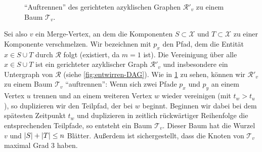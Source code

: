 \begin{beweis}
\begin{figure}
{\label{fig:entwirren-baum}}
		\caption{\enquote{Auftrennen} des gerichteten azyklischen Graphen $\mathcal{R}'_v$ zu einem Baum $\mathcal{T}_v$.}
	\end{figure}
	
	Sei also $v$ ein Merge-Vertex, an dem die Komponenten $S \subset \mathcal{X}$ und $T \subset \mathcal{X}$ zu einer Komponente verschmelzen.
	Wir bezeichnen mit $p_x$ den Pfad, dem die Entität $x \in S \cup T$ durch $\mathcal{R}$ folgt (existiert, da $m=1$ ist).
	Die Vereinigung über alle $x \in S \cup T$ ist ein gerichteter azyklischer Graph $\mathcal{R}'_v$ und insbesondere ein Untergraph von $\mathcal{R}$ (siehe \cref{fig:entwirren-DAG}).
	Wie in \cref{fig:entwirren-baum} zu sehen, können wir $\mathcal{R}'_v$ zu einem Baum $\mathcal{T}_v$ \enquote{auftrennen}:
	Wenn sich zwei Pfade $p_x$ und $p_y$ an einem Vertex $u$ trennen und an einem weiteren Vertex $w$ wieder vereinigen (mit $t_w > t_u$), so duplizieren wir den Teilpfad, der bei $w$ beginnt. 
	Beginnen wir dabei bei dem spätesten Zeitpunkt $t_w$ und duplizieren in zeitlich rückwärtiger Reihenfolge die entsprechenden Teilpfade, so entsteht ein Baum $\mathcal{T}_v$.
	Dieser Baum hat die Wurzel $v$ und $\abs*{S}+ \abs*{T} \le n$ Blätter. 
	Außerdem ist sichergestellt, dass die Knoten von $\mathcal{T}_v$ maximal Grad 3 haben.
	

\end{beweis}
